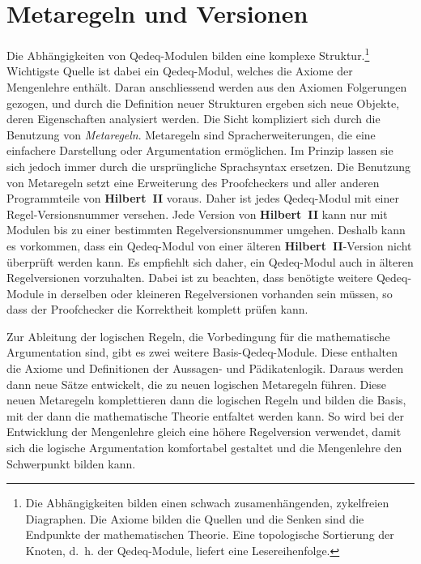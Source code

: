 \documentclass[a4paper,german,10pt,twoside]{book}
\begin{document}
{\section{Metaregeln und
Versionen}\label{Metaregeln_und_Versionen} Die
Abh{\"a}ngigkeiten von Qedeq-Modulen bilden eine komplexe Struktur.\footnote{Die Abh{\"a}ngigkeiten bilden
einen schwach zusamenh{\"a}ngenden, zykelfreien Diagraphen. Die Axiome bilden die Quellen und die
Senken sind die Endpunkte der mathematischen Theorie. Eine topologische Sortierung der Knoten,
d.~h. der Qedeq-Module, liefert eine Lesereihenfolge.} Wichtigste Quelle ist dabei ein Qedeq-Modul,
welches die Axiome der Mengenlehre enth{\"a}lt. Daran anschliessend werden aus den Axiomen Folgerungen
gezogen, und durch die Definition neuer Strukturen ergeben sich neue Objekte, deren Eigenschaften
analysiert werden. Die Sicht kompliziert sich durch die Benutzung von \emph{Metaregeln}. Metaregeln
sind Spracherweiterungen, die eine einfachere Darstellung oder Argumentation erm{\"o}glichen. Im
Prinzip lassen sie sich jedoch immer durch die urspr{\"u}ngliche Sprachsyntax ersetzen. Die Benutzung
von Metaregeln setzt eine Erweiterung des Proofcheckers und aller anderen Programmteile von
\textbf{Hilbert~II} voraus. Daher ist jedes Qedeq-Modul mit einer Regel-Versionsnummer versehen.
Jede Version von \textbf{Hilbert~II} kann nur mit Modulen bis zu einer bestimmten
Regelversionsnummer umgehen. Deshalb kann es vorkommen, dass ein Qedeq-Modul von einer {\"a}lteren
\textbf{Hilbert~II}-Version nicht {\"u}berpr{\"u}ft werden kann. Es empfiehlt sich daher, ein Qedeq-Modul
auch in {\"a}lteren Regelversionen vorzuhalten. Dabei ist zu beachten, dass ben{\"o}tigte weitere
Qedeq-Module in derselben oder kleineren Regelversionen vorhanden sein m{\"u}ssen, so dass der
Proofchecker die Korrektheit komplett pr{\"u}fen kann.
\par
Zur Ableitung der logischen Regeln, die Vorbedingung f{\"u}r die mathematische Argumentation sind, gibt
es zwei weitere Basis-Qedeq-Module. Diese enthalten die Axiome und Definitionen der Aussagen- und
P{\"a}dikatenlogik. Daraus werden dann neue S{\"a}tze entwickelt, die zu neuen logischen Metaregeln f{\"u}hren.
Diese neuen Metaregeln komplettieren dann die logischen Regeln und bilden die Basis, mit der dann
die mathematische Theorie entfaltet werden kann. So wird bei der Entwicklung der Mengenlehre gleich
eine h{\"o}here Regelversion verwendet, damit sich die logische Argumentation komfortabel gestaltet und
die Mengenlehre den Schwerpunkt bilden kann.

}
\end{document}
